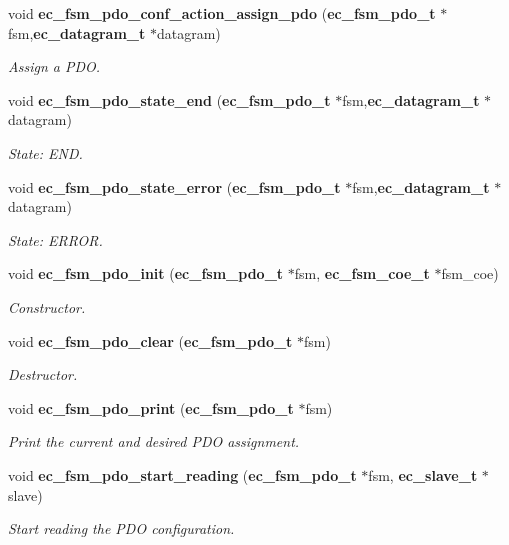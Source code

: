 \begin{DoxyCompactItemize}
void {\bf ec\-\_\-fsm\-\_\-pdo\-\_\-conf\-\_\-action\-\_\-assign\-\_\-pdo} ({\bf ec\-\_\-fsm\-\_\-pdo\-\_\-t} $\ast$fsm,{\bf ec\-\_\-datagram\-\_\-t} $\ast$datagram)
\begin{DoxyCompactList}\small\item\em Assign a P\-D\-O. \end{DoxyCompactList}\item 
void {\bf ec\-\_\-fsm\-\_\-pdo\-\_\-state\-\_\-end} ({\bf ec\-\_\-fsm\-\_\-pdo\-\_\-t} $\ast$fsm,{\bf ec\-\_\-datagram\-\_\-t} $\ast$datagram)
\begin{DoxyCompactList}\small\item\em State\-: E\-N\-D. \end{DoxyCompactList}\item 
void {\bf ec\-\_\-fsm\-\_\-pdo\-\_\-state\-\_\-error} ({\bf ec\-\_\-fsm\-\_\-pdo\-\_\-t} $\ast$fsm,{\bf ec\-\_\-datagram\-\_\-t} $\ast$datagram)
\begin{DoxyCompactList}\small\item\em State\-: E\-R\-R\-O\-R. \end{DoxyCompactList}\item 
void {\bf ec\-\_\-fsm\-\_\-pdo\-\_\-init} ({\bf ec\-\_\-fsm\-\_\-pdo\-\_\-t} $\ast$fsm, {\bf ec\-\_\-fsm\-\_\-coe\-\_\-t} $\ast$fsm\-\_\-coe)
\begin{DoxyCompactList}\small\item\em Constructor. \end{DoxyCompactList}\item 
void {\bf ec\-\_\-fsm\-\_\-pdo\-\_\-clear} ({\bf ec\-\_\-fsm\-\_\-pdo\-\_\-t} $\ast$fsm)
\begin{DoxyCompactList}\small\item\em Destructor. \end{DoxyCompactList}\item 
void {\bf ec\-\_\-fsm\-\_\-pdo\-\_\-print} ({\bf ec\-\_\-fsm\-\_\-pdo\-\_\-t} $\ast$fsm)
\begin{DoxyCompactList}\small\item\em Print the current and desired P\-D\-O assignment. \end{DoxyCompactList}\item 
void {\bf ec\-\_\-fsm\-\_\-pdo\-\_\-start\-\_\-reading} ({\bf ec\-\_\-fsm\-\_\-pdo\-\_\-t} $\ast$fsm, {\bf ec\-\_\-slave\-\_\-t} $\ast$slave)
\begin{DoxyCompactList}\small\item\em Start reading the P\-D\-O configuration. \end{DoxyCompactList}\item 

\end{DoxyCompactItemize}
